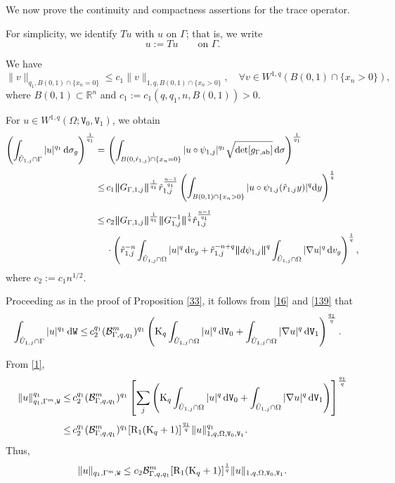 \documentclass[reqno, 11pt, a4paper]{amsart}
\numberwithin{equation}{section}
\newcommand{\dvg}{\textnormal{d}v_g}
\newcommand{\ds}{\textnormal{d}\sigma}
\newcommand{\dsg}{\textnormal{d}\sigma _g}
\newcommand{\gij}{\textnormal{a}  \textnormal{b}}
\newcommand{\ck}{\textnormal K}
\newcommand{\wghtv}{\mathtt{V}}
\newcommand{\wghtw}{\mathtt{W}}
\newcommand{\dwv}{\textnormal{d} \mathtt{V}}
\newcommand{\dww}{\textnormal{d} \mathtt{W}}
\newcommand{\rd}{\textnormal{R}}
\newcommand{\qxp}{q}
\newcommand{\dy}{\textnormal{d}y}
\newcommand{\bnorm}{\boldsymbol{\|}}
\begin{document}
 
 We now prove the continuity and compactness assertions for the trace operator.

For simplicity, we identify \(Tu\) with \(u\) on \(\Gamma\); that is, we write
\[
u:=Tu
\qquad\text{on }\Gamma.
\]


We have
$$
\|v\|_{\qxp_1,B(0,1)\cap\{x_n=0\}}
\leq c_1\|v\|_{1,\qxp,B(0,1)\cap\{x_n>0\}},
\quad\forall v\in W^{1,\qxp}(B(0,1)\cap\{x_n>0\}),
$$
where $B(0,1)\subset \mathbb{R}^n$ and $c_1 := c_1(\qxp , \qxp _1 , n , B(0,1))>0$.



For $u\in W^{1,\qxp}(\Omega;\wghtv_0,\wghtv_1)$, we obtain
\begin{align*}
\left(\int_{\hat U_{1,j}\cap\Gamma}|u|^{\qxp_1}\,\dsg\right)^{\frac1{\qxp_1}} = & \,  \displaystyle   \left(\int_{ B(0 , \hat r_{1,j} )\cap \{x_n =0\}  } | u \circ \psi _{1,j} |^{\qxp _1}  \sqrt{\det [ g_{\Gamma, \gij}]} \, \ds \right)^{\frac{1}{\qxp _1}}\\[3pt]
  \leq & \, \displaystyle   c _1 \bnorm  G_{\Gamma , 1,j} \bnorm ^{\frac{1}{\qxp _1}}  \hat{r}_{1,j}^{\frac{n-1}{\qxp _1 }} \left(\int_{ B(0 , 1 )\cap \{x_n >0\}} | u \circ \psi _{1,j}(\hat r _{1,j} y) |^{\qxp }   \dy \right)^{\frac{1}{\qxp}} \\[5pt]
\leq&\,\displaystyle c_2 \bnorm G_{\Gamma,1,j}\bnorm^{\frac1{\qxp_1}}
\bnorm G_{1,j}^{-1}\bnorm^{\frac1\qxp}\hat r_{1,j}^{\frac{n-1}{\qxp_1}}\\[3pt]
&\,\displaystyle\cdot\left(\hat r_{1,j}^{-n}\int_{\hat U_{1,j}\cap\Omega}|u|^{\qxp}\,\dvg
+\hat r_{1,j}^{-n+\qxp}\bnorm d\psi_{1,j}\bnorm^{\qxp}
\int_{\hat U_{1,j}\cap\Omega}|\nabla u|^{\qxp}\,\dvg\right)^{\frac1\qxp},
\end{align*}
where $c_2 := c_1 n^{1/2}$.

Proceeding as in the proof of Proposition \ref{33}, it follows from \ref{16} and \ref{139} that
\begin{align*}
\int_{\hat U_{1,j}\cap\Gamma}|u|^{\qxp_1}\,\dww
\leq&\,\displaystyle c_2 ^{\qxp_1}(\mathcal B_{\Gamma,\qxp,\qxp_1}^m)^{\qxp_1}
\left(\ck_{\qxp}\int_{\hat U_{1,j}\cap\Omega}|u|^{\qxp}\,\dwv_0
+\int_{\hat U_{1,j}\cap\Omega}|\nabla u|^{\qxp}\,\dwv_1\right)^{\frac{\qxp_1}\qxp}.
\end{align*}

From \ref{1},
\begin{align*}
\|u\|_{\qxp_1,\Gamma^{m},\wghtw}^{\qxp_1}
\leq&\,\displaystyle c_2 ^{\qxp_1}(\mathcal B_{\Gamma,\qxp,\qxp_1}^m)^{\qxp_1}
\left[\sum_j\left(\ck_{\qxp}\int_{\hat U_{1,j}\cap\Omega}|u|^{\qxp}\,\dwv_0
+\int_{\hat U_{1,j}\cap\Omega}|\nabla u|^{\qxp}\,\dwv_1\right)\right]^{\frac{\qxp_1}\qxp}\\[3pt]
\leq&\,\displaystyle c_2 ^{\qxp_1}(\mathcal B_{\Gamma,\qxp,\qxp_1}^m)^{\qxp_1}
[\rd_1(\ck_{\qxp}+1)]^{\frac{\qxp_1}\qxp}
\|u\|_{1,\qxp,\Omega,\wghtv_0,\wghtv_1}^{\qxp_1}.
\end{align*}
Thus,
\begin{equation}\label{35}
\|u\|_{\qxp_1,\Gamma^{m},\wghtw}
\leq c_2 \mathcal B_{\Gamma,\qxp,\qxp_1}^m[\rd_1(\ck_{\qxp}+1)]^{\frac1\qxp}
\|u\|_{1,\qxp,\Omega,\wghtv_0,\wghtv_1}.
\end{equation}
\end{document}
